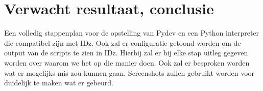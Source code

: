 \section{Verwacht resultaat, conclusie}%
\label{sec:verwachte_resultaten}
Een volledig stappenplan voor de opstelling van Pydev en een Python interpreter die compatibel zijn met IDz. Ook zal er configuratie getoond worden om de output van de scripts te zien in IDz. Hierbij zal er bij elke stap uitleg gegeven worden over waarom we het op die manier doen. Ook zal er besproken worden wat er mogelijks mis zou kunnen gaan. Screenshots zullen gebruikt worden voor duidelijk te maken wat er gebeurd.


 